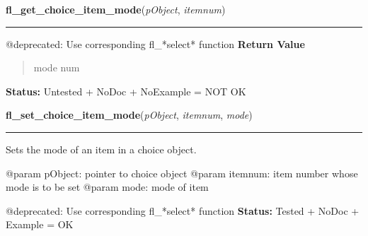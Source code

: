     \label{xformslib:deprecated:fl_get_choice_item_mode}

    \vspace{0.5ex}

\hspace{.8\funcindent}\begin{boxedminipage}{\funcwidth}

    \raggedright \textbf{fl\_get\_choice\_item\_mode}(\textit{pObject}, \textit{itemnum})

    \vspace{-1.5ex}

    \rule{\textwidth}{0.5\fboxrule}
\setlength{\parskip}{2ex}

@deprecated: Use corresponding fl\_*select* function
\setlength{\parskip}{1ex}
      \textbf{Return Value}
    \vspace{-1ex}

      \begin{quote}

mode num
      \end{quote}

\textbf{Status:} 
Untested + NoDoc + NoExample = NOT OK


    \end{boxedminipage}

    \label{xformslib:deprecated:fl_set_choice_item_mode}

    \vspace{0.5ex}

\hspace{.8\funcindent}\begin{boxedminipage}{\funcwidth}

    \raggedright \textbf{fl\_set\_choice\_item\_mode}(\textit{pObject}, \textit{itemnum}, \textit{mode})

    \vspace{-1.5ex}

    \rule{\textwidth}{0.5\fboxrule}
\setlength{\parskip}{2ex}

Sets the mode of an item in a choice object.

@param pObject: pointer to choice object
@param itemnum: item number whose mode is to be set
@param mode: mode of item

@deprecated: Use corresponding fl\_*select* function
\setlength{\parskip}{1ex}
\textbf{Status:} 
Tested + NoDoc + Example = OK


    \end{boxedminipage}


